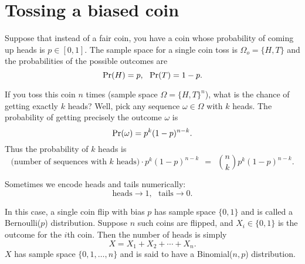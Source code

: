 \section{Tossing a biased coin}

Suppose that instead of a fair coin, you have a coin whose probability of coming up heads is $p \in [0,1]$. The sample space for a single coin toss is $\Omega_o = \{H,T\}$ and the probabilities of the possible outcomes are
$$ \mbox{\rm Pr}(H) = p, \ \ \mbox{\rm Pr}(T) = 1-p.$$

If you toss this coin $n$ times (sample space $\Omega = \{H,T\}^n$), what is the chance of getting exactly $k$ heads? Well, pick any sequence $\omega \in \Omega$ with $k$ heads. The probability of getting precisely the outcome $\omega$ is
$$ \mbox{\rm Pr}(\omega) = p^k (1-p)^{n-k} .$$
Thus the probability of $k$ heads is
$$ \mbox{(number of sequences with $k$ heads)} \cdot p^k (1-p)^{n-k} 
\ \ = \ \ 
{n \choose k} p^k (1-p)^{n-k} .$$

Sometimes we encode heads and tails numerically:
$$ \mbox{heads} \rightarrow 1, \ \ \ \mbox{tails} \rightarrow 0 .$$

In this case, a single coin flip with bias $p$ has sample space $\{0,1\}$ and is called a Bernoulli($p$) distribution. Suppose $n$ such coins are flipped, and $X_i \in \{0,1\}$ is the outcome for the $i$th coin. Then the number of heads is simply 
$$ X = X_1 + X_2 + \cdots + X_n. $$
$X$ has sample space $\{0,1,\ldots,n\}$ and is said to have a Binomial($n,p$) distribution.
